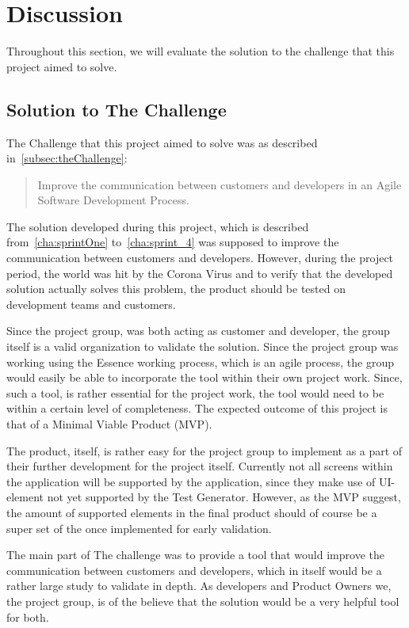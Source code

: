 \section{Discussion}

Throughout this section, we will evaluate the solution to the challenge that this project aimed to solve.

\subsection{Solution to The Challenge}

The Challenge that this project aimed to solve was as described in~\autoref{subsec:theChallenge}:

\begin{quote}
    Improve the communication between customers and developers in an Agile Software Development Process.
\end{quote}

The solution developed during this project, which is described from~\autoref{cha:sprintOne} to~\autoref{cha:sprint_4} was supposed to improve the communication between customers and developers.
However, during the project period, the world was hit by the Corona Virus and to verify that the developed solution actually solves this problem, the product should be tested on development teams and customers.

Since the project group, was both acting as customer and developer, the group itself is a valid organization to validate the solution.
Since the project group was working using the Essence working process, which is an agile process, the group would easily be able to incorporate the tool within their own project work.
Since, such a tool, is rather essential for the project work, the tool would need to be within a certain level of completeness.
The expected outcome of this project is that of a Minimal Viable Product (MVP).

The product, itself, is rather easy for the project group to implement as a part of their further development for the project itself.
Currently not all screens within the application will be supported by the application, since they make use of UI-element not yet supported by the Test Generator.
However, as the MVP suggest, the amount of supported elements in the final product should of course be a super set of the once implemented for early validation.

The main part of The challenge was to provide a tool that would improve the communication between customers and developers, which in itself would be a rather large study to validate in depth.
As developers and Product Owners we, the project group, is of the believe that the solution would be a very helpful tool for both.

